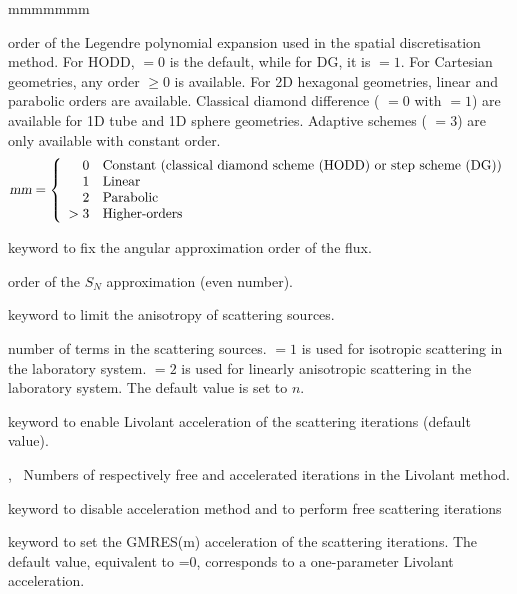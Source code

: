 \begin{ListeDeDescription}{mmmmmmm}
\item[\dusa{mm}] order of the Legendre polynomial expansion used in the spatial discretisation method. For HODD,  $=0$ is the default, while for DG, it is  $=1$.
For Cartesian geometries, any order  $\geq0$ is available. For 2D hexagonal geometries, linear and parabolic orders are available. Classical diamond difference ( $=0$ with  $=1$) are available for 1D tube and 1D sphere geometries. Adaptive schemes ( $=3$) are only available with constant order.
\begin{displaymath}
\dusa{mm} = \left\{
\begin{array}{rl}
 0 & \textrm{Constant (classical diamond scheme (HODD) or step scheme (DG))} \\
 1 & \textrm{Linear} \\
 2 & \textrm{Parabolic} \\
 >3  & \textrm{Higher-orders}
\end{array} \right.
\end{displaymath}

\item[\moc{SN}] keyword to fix the angular approximation order of the flux.

\item[\dusa{n}] order of the $S_N$ approximation (even number).

\item[\moc{SCAT}] keyword to limit the anisotropy of scattering sources.

\item[\dusa{iscat}] number of terms in the scattering sources.  $=1$ is used for
isotropic scattering in the laboratory system.  $=2$ is used for
linearly anisotropic scattering in the laboratory system. The default value is set to $n$.

\item[\moc{LIVO}] keyword to enable Livolant acceleration of the scattering iterations (default value).
\item[\dusa{icl1},~\dusa{icl2}] Numbers of respectively free and accelerated iterations in the Livolant method.
\item[\moc{NLIVO}] keyword to disable acceleration method and to perform free scattering iterations

\item[\moc{GMRES}] keyword to set the GMRES(m) acceleration of the scattering iterations. The default value,
equivalent to =0, corresponds to a one-parameter Livolant acceleration.\cite{gmres}


\end{ListeDeDescription}
